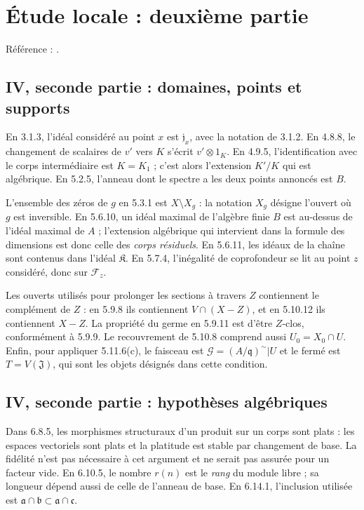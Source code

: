 \documentclass[11pt,a4paper]{article}
\begin{document}
\section{Étude locale : deuxième partie}
\label{part:iv2}
Référence : \cite{EGAIV2}.
\subsection{IV, seconde partie : domaines, points et supports}
\label{note:iv2-domains}
En 3.1.3, l'idéal considéré au point $x$ est $\mathfrak j_x$, avec la
notation de 3.1.2. En 4.8.8, le changement de scalaires de $v'$ vers
$K$ s'écrit $v'\otimes1_K$. En 4.9.5, l'identification avec le corps
intermédiaire est $K=K_1$ ; c'est alors l'extension $K'/K$ qui est
algébrique. En 5.2.5, l'anneau dont le spectre a les deux points annoncés
est $B$.

L'ensemble des zéros de $g$ en 5.3.1 est $X\setminus X_g$ : la notation
$X_g$ désigne l'ouvert où $g$ est inversible. En 5.6.10, un idéal maximal
de l'algèbre finie $B$ est au-dessus de l'idéal maximal de $A$ ; l'extension
algébrique qui intervient dans la formule des dimensions est donc celle
des \emph{corps résiduels}. En 5.6.11, les idéaux de la chaîne sont contenus
dans l'idéal $\mathfrak K$. En 5.7.4, l'inégalité de coprofondeur se lit
au point $z$ considéré, donc sur $\mathscr F_z$.

Les ouverts utilisés pour prolonger les sections à travers $Z$ contiennent
le complément de $Z$ : en 5.9.8 ils contiennent $V\cap(X-Z)$, et en 5.10.12
ils contiennent $X-Z$. La propriété du germe en 5.9.11 est d'être
$Z$-clos, conformément à 5.9.9. Le recouvrement de 5.10.8 comprend aussi
$U_0=X_0\cap U$. Enfin, pour appliquer 5.11.6(c), le faisceau est
$\mathcal G=(A/\mathfrak q)^\sim|U$ et le fermé est $T=V(\mathfrak J)$,
qui sont les objets désignés dans cette condition.

\subsection{IV, seconde partie : hypothèses algébriques}
\label{note:iv2-flatness}
Dans 6.8.5, les morphismes structuraux d'un produit sur un corps sont
plats : les espaces vectoriels sont plats et la platitude est stable par
changement de base. La fidélité n'est pas nécessaire à cet argument et
ne serait pas assurée pour un facteur vide. En 6.10.5, le nombre $r(n)$
est le \emph{rang} du module libre ; sa longueur dépend aussi de celle
de l'anneau de base. En 6.14.1, l'inclusion utilisée est
$\mathfrak a\cap\mathfrak b\subset\mathfrak a\cap\mathfrak c$.
\end{document}
